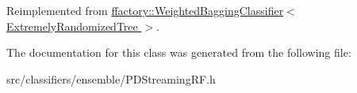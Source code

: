Reimplemented from \hyperlink{classffactory_1_1_weighted_bagging_classifier_a9c083e5508f58695c569dd2a4df50fd3}{ffactory\-::\-Weighted\-Bagging\-Classifier$<$ Extremely\-Randomized\-Tree $>$}.



The documentation for this class was generated from the following file\-:\begin{DoxyCompactItemize}
\item 
src/classifiers/ensemble/P\-D\-Streaming\-R\-F.\-h\end{DoxyCompactItemize}

